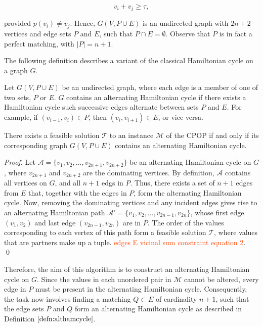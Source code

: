 \documentclass[oribibl]{llncs}
\begin{document}
\begin{equation}
	\label{eqn:jointsum}
	v_i + v_j \geq \tau,
\end{equation}

provided $p(v_i) \neq v_j$. Hence, $G(V, P \cup E)$ is an undirected graph with $2n + 2$ vertices and edge sets $P$ and $E$, such that $P \cap E = \emptyset$. Observe that $P$ is in fact a perfect matching, with $|P|= n+1$.

The following definition describes a variant of the classical Hamiltonian cycle on a graph $G$.

\begin{definition}
	\label{defn:althamcycle}
	Let $G(V, P\cup E)$ be an undirected graph, where each edge is a member of one of two sets, $P$ or $E$. $G$ contains an alternating Hamiltonian cycle if there exists a Hamiltonian cycle such successive edges alternate between sets $P$ and $E$. For example, if $(v_{i-1}, v_i) \in P$, then $(v_i, v_{i+1}) \in E$, or vice versa.
\end{definition}

\begin{theorem}
	\label{thm:cpopsoln}
	There exists a feasible solution $\mathcal{T}$ to an instance $\mathcal{M}$ of the CPOP if and only if its corresponding graph $G(V, P\cup E)$ contains an alternating Hamiltonian cycle.
\end{theorem}
\begin{proof}
	Let $\mathcal{A} = \{v_1, v_2, ..., v_{2n+1}, v_{2n+2}\}$ be an alternating Hamiltonian cycle on $G$, where $v_{2n+1}$ and $v_{2n+2}$ are the dominating vertices. By definition, $\mathcal{A}$ contains all vertices on $G$, and all $n+1$ edgs in $P$. Thus, there exists a set of $n+1$ edges from $E$ that, together with the edges in $P$, form the alternating Hamiltonian cycle. Now, removing the dominating vertices and any incident edges gives rise to an alternating Hamiltonian path $\mathcal{A}' = \{v_1, v_2, ..., v_{2n-1}, v_{2n}\}$, whose first edge $(v_1, v_2)$ and last edge $(v_{2n-1}, v_{2n})$ are in $P$. The order of the values corresponding to each vertex of this path form a feasible solution $\mathcal{T}$, where values that are partners make up a tuple. \textcolor{OrangeRed}{edges E vicinal sum constraint equation 2}. \qed
\end{proof}

Therefore, the aim of this algorithm is to construct an alternating Hamiltonian cycle on $G$. Since the values in each unordered pair in $\mathcal{M}$ cannot be altered, every edge in $P$ must be present in the alternating Hamiltonian cycle. Consequently, the task now involves finding a matching $Q \subset E$ of cardinality $n+1$, such that the edge sets $P$ and $Q$ form an alternating Hamiltonian cycle as described in Definition $\ref{defn:althamcycle}$.  
\end{document}
